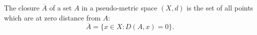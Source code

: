 The closure $\overline{A}$ of a set $A$ in a pseudo-metric space $(X,d)$ is the set of all points which are at zero distance from $A$:
$$\overline{A} = \{x \in X : D(A,x) = 0\}.$$
